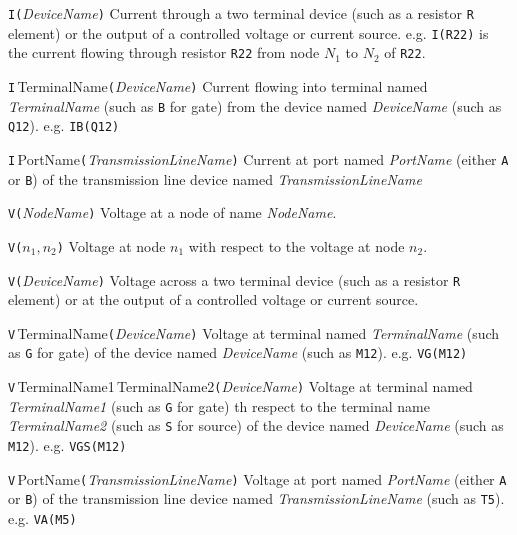\begin{widelist}

\item[{\tt I(}{\it DeviceName}{\tt )}]
Current through a two terminal device (such as a resistor {\tt R} element) or
the output of a controlled voltage or current source. e.g.
{\tt I(R22)} is the current flowing through resistor {\tt R22}
from node $N_1$ to $N_2$ of {\tt R22}.

\item[{\tt I}{$\,$TerminalName}{\tt (}{\it DeviceName}{\tt )}]
Current flowing into terminal named {\it TerminalName} (such as {\tt B} for
gate) from the device named {\it DeviceName} (such as {\tt Q12}).
e.g. {\tt IB(Q12)}

\item[{\tt I}{$\,$PortName}{\tt (}{\it TransmissionLineName}{\tt )}]
Current at port named {\it PortName} (either {\tt A} or {\tt B}) of the
transmission line device named   {\it TransmissionLineName}

\item[{\tt V(}{\it NodeName}{\tt )}]
Voltage at a node of name {\it NodeName}.

\item[{\tt V(}{$n_1,n_2$}{\tt )}]
Voltage at node $n_1$ with respect to the voltage
 at node $n_2$.

\item[{\tt V(}{\it DeviceName}{\tt )}]
Voltage across a two terminal device (such
as a resistor {\tt R} element) or
at the output of a controlled voltage or current source.

\item[{\tt V}{$\,$TerminalName}{\tt (}{\it DeviceName}{\tt )}]
Voltage at terminal named {\it TerminalName} (such as {\tt G} for gate) of the
device named   {\it DeviceName} (such as {\tt M12}). e.g. {\tt VG(M12)}

\item[{\tt V}{$\,$TerminalName1$\,$TerminalName2}{\tt (}{\it DeviceName}{\tt )}]
Voltage at terminal named {\it TerminalName1} (such as {\tt G} for gate) th respect to the terminal name {\it TerminalName2} (such as {\tt S} for source) of the
device named   {\it DeviceName} (such as {\tt M12}). e.g. {\tt VGS(M12)}

\item[{\tt V}{$\,$PortName}{\tt (}{\it TransmissionLineName}{\tt )}]
Voltage at port named {\it PortName} (either {\tt A} or {\tt B}) of the
transmission line device named   {\it TransmissionLineName} (such as
{\tt T5}). e.g. {\tt VA(M5)}

\end{widelist}

